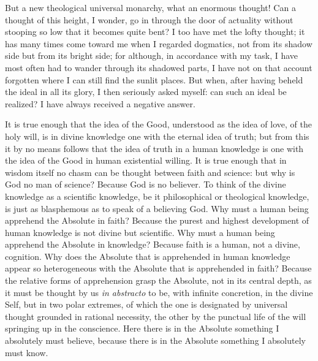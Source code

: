 \documentclass[12pt]{book}
\newcommand{\opage}[1]{\marginnote{\footnotesize\textit{[#1]}}}
\begin{document}
But a new theological universal monarchy, what an enormous thought! Can a thought of this height, I wonder, go in through the door of actuality without stooping so low that it becomes quite bent? I too have met the lofty thought; it has many times come toward me when I regarded dogmatics, not from its shadow side but from its bright side; for although, in accordance with my task, I have most often had to wander through its shadowed parts, I have not on that account forgotten where I can still find the sunlit places. But when, after having beheld the ideal in all its glory, I then seriously asked myself: can such an ideal be realized? I have always received a negative answer.

It is true enough that the idea of the Good, understood as
\opage{7}\setcounter{footnote}{0}%
the idea of love, of the holy will, is in divine knowledge one with the eternal idea of truth; but from this it by no means follows that the idea of truth in a human knowledge is one with the idea of the Good in human existential willing. It is true enough that in wisdom itself no chasm can be thought between faith and science: but why is God no man of science? Because God is no believer. To think of the divine knowledge as a scientific knowledge, be it philosophical or theological knowledge, is just as blasphemous as to speak of a believing God. Why must a human being apprehend the Absolute in faith? Because the purest and highest development of human knowledge is not divine but scientific. Why must a human being apprehend the Absolute in knowledge? Because faith is a human, not a divine, cognition. Why does the Absolute that is apprehended in human knowledge appear so heterogeneous with the Absolute that is apprehended in faith? Because the relative forms of apprehension grasp the Absolute, not in its central depth, as it must be thought by us \textit{in abstracto} to be, with infinite concretion, in the divine Self, but in two polar extremes, of which the one is designated by universal thought grounded in rational necessity, the other by the punctual life of the will springing up in the conscience. Here there is in the Absolute something I absolutely must believe, because there is in the Absolute something I absolutely must know.
\end{document}
